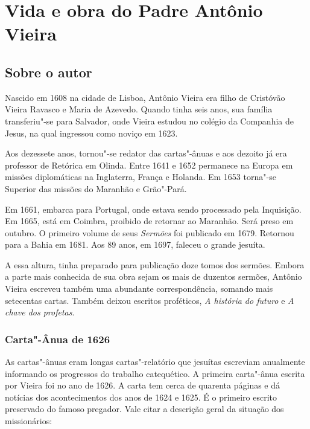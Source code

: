 \chapter{Vida e obra do Padre Antônio Vieira}

\section{Sobre o autor}

\noindent{}Nascido em 1608 na cidade de Lisboa, Antônio Vieira era filho de
Cristóvão Vieira Ravasco e Maria de Azevedo. Quando tinha seis anos, sua
família transferiu"-se para Salvador, onde Vieira estudou no colégio da
Companhia de Jesus, na qual ingressou como noviço em 1623.

Aos dezessete anos, tornou"-se redator das cartas"-ânuas e aos dezoito já
era professor de Retórica em Olinda. Entre 1641 e 1652 permanece na
Europa em missões diplomáticas na Inglaterra, França e Holanda. Em 1653
torna"-se Superior das missões do Maranhão e Grão"-Pará.

Em 1661, embarca para Portugal, onde estava sendo processado pela
Inquisição. Em 1665, está em Coimbra, proibido de retornar ao Maranhão.
Será preso em outubro. O primeiro volume de seus \emph{Sermões} foi
publicado em 1679. Retornou para a Bahia em 1681. Aos 89 anos, em 1697,
faleceu o grande jesuíta.

A essa altura, tinha preparado para publicação doze tomos dos sermões.
Embora a parte mais conhecida de sua obra sejam os mais de duzentos
sermões, Antônio Vieira escreveu também uma abundante correspondência,
somando mais setecentas cartas. Também deixou escritos proféticos,
\emph{A história do futuro} e \emph{A chave dos profetas}.

\subsection{Carta"-Ânua de 1626}

As cartas"-ânuas eram longas cartas"-relatório que jesuítas escreviam
anualmente informando os progressos do trabalho catequético. A primeira
carta"-ânua escrita por Vieira foi no ano de 1626. A carta tem cerca de
quarenta páginas e dá notícias dos acontecimentos dos anos de 1624 e
1625. É o primeiro escrito preservado do famoso pregador. Vale citar a
descrição geral da situação dos missionários:

